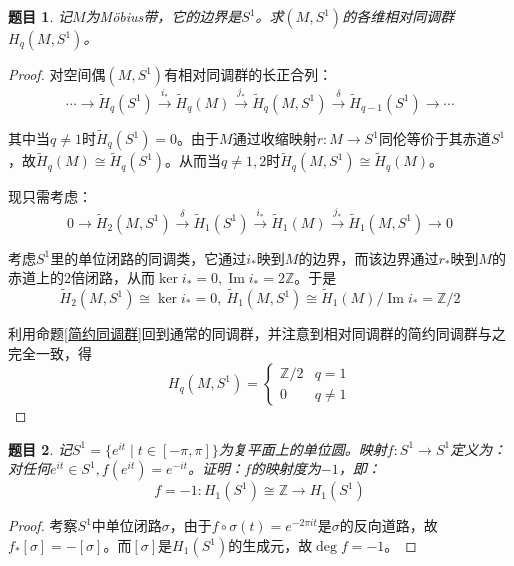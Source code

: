 \documentclass[UTF-8,11pt,fancyhdr,hyperref,titlepage]{ctexart}
\theoremstyle{question}
\newtheorem{timu}{题目}
\theoremstyle{theorem}
\theoremstyle{definition}
\theoremstyle{remark}
\def\ZZ{{\mathbb Z}}
\def\longto{\longrightarrow}
\def\To{\longto}
\newcommand{\markar}[1]{\stackrel{{#1}}{\longrightarrow}}%
\newcommand{\rH}[1]{\widetilde{H}_{#1}}
\DeclareMathOperator{\im}{Im}
\begin{document}
\begin{timu}\label{27}
  记$M$为M\"{o}bius带，它的边界是$S^1$。求$(M,S^1)$的各维相对同调群$H_q(M,S^1)$。
\end{timu}
\begin{proof}
  对空间偶$(M,S^1)$有相对同调群的长正合列：
  \begin{equation*}
    \cdots\To \rH{q}(S^1) \markar{i_{\ast}} \rH{q}(M) \markar{j_{\ast}} \rH{q}(M,S^1) \markar{\delta} \rH{q-1}(S^1) \To \cdots
  \end{equation*}
  
  其中当$q\neq1$时$\rH{q}(S^1)=0$。由于$M$通过收缩映射$r\colon M\To S^1$同伦等价于其赤道$S^1$，故$\rH{q}(M)\cong\rH{q}(S^1)$。从而当$q\neq1,2$时$\rH{q}(M,S^1)\cong\rH{q}(M)$。
  
  现只需考虑：
  \begin{equation*}
    0\To \rH{2}(M,S^1) \markar{\delta} \rH{1}(S^1) \markar{i_{\ast}} \rH{1}(M) \markar{j_{\ast}} \rH{1}(M,S^1) \To 0
  \end{equation*}
    
  考虑$S^1$里的单位闭路的同调类，它通过$i_{\ast}$映到$M$的边界，而该边界通过$r_{\ast}$映到$M$的赤道上的$2$倍闭路，从而$\ker i_{\ast}=0, \im i_{\ast}=2\ZZ$。于是
  \begin{equation*}
    \rH{2}(M,S^1)\cong\ker i_{\ast}=0, \ \rH{1}(M,S^1)\cong \rH{1}(M)/\im i_{\ast}=\ZZ/2
  \end{equation*}
  
   利用命题\ref{简约同调群}回到通常的同调群，并注意到相对同调群的简约同调群与之完全一致，得
   \begin{equation*}
     H_q(M,S^1)=
     \begin{cases}
       \ZZ/2 & q=1\\
       0 & q\neq 1
     \end{cases}
   \end{equation*}
\end{proof}

\begin{timu}\label{28}
  记$S^1=\{e^{it}\mid t\in[-\pi,\pi]\}$为复平面上的单位圆。映射$f\colon S^1\To S^1$定义为：对任何$e^{it}\in S^1, f(e^{it})=e^{-it}$。证明：$f$的映射度为$-1$，即：
  \begin{equation*}
  f=-1\colon H_1(S^1)\cong\ZZ\To H_1(S^1)
  \end{equation*}
\end{timu}
\begin{proof}
  考察$S^1$中单位闭路$\sigma$，由于$f\circ\sigma(t)=e^{-2\pi it}$是$\sigma$的反向道路，故$f_{\ast}[\sigma]=-[\sigma]$。而$[\sigma]$是$H_1(S^1)$的生成元，故$\deg f=-1$。
\end{proof}
\end{document}

